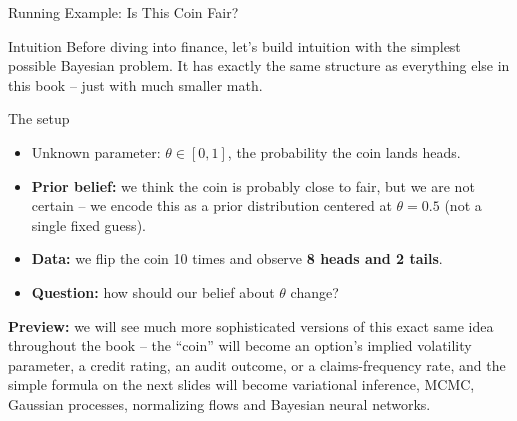 \documentclass[aspectratio=169,10pt]{beamer}
\newcommand{\thetav}{\theta}
\begin{document}
\begin{frame}{Running Example: Is This Coin Fair?}
  \begin{block}{Intuition}
    Before diving into finance, let's build intuition with the simplest
    possible Bayesian problem. It has exactly the same structure as
    everything else in this book -- just with much smaller math.
  \end{block}
  \begin{block}{The setup}
    \begin{itemize}
      \item Unknown parameter: $\thetav \in [0,1]$, the probability the
      coin lands heads.
      \item \textbf{Prior belief:} we think the coin is probably close to
      fair, but we are not certain -- we encode this as a prior distribution
      centered at $\thetav = 0.5$ (not a single fixed guess).
      \item \textbf{Data:} we flip the coin 10 times and observe
      \textbf{8 heads and 2 tails}.
      \item \textbf{Question:} how should our belief about $\thetav$ change?
    \end{itemize}
  \end{block}
  \textbf{Preview:} we will see much more sophisticated versions of this
  exact same idea throughout the book -- the ``coin'' will become an
  option's implied volatility parameter, a credit rating, an audit outcome,
  or a claims-frequency rate, and the simple formula on the next slides will
  become variational inference, MCMC, Gaussian processes, normalizing flows
  and Bayesian neural networks.
\end{frame}
\end{document}

